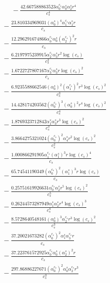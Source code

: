 \documentclass[10pt]{article}
\begin{document}
\begin{align*}
\phantom{R_{3,9}} &\phantom{={}}{}  - \frac{42.667588863523 \alpha_{0}^{c_s} \alpha_{0}^s \alpha_{2}^s r^{4}}{c_{s}^{4}} \\
&{}  - \frac{23.810334969031 \left(\alpha_{0}^s\right)^{4} \alpha_{1}^{c_s} \alpha_{1}^s r}{c_{s}} \\
&{}  - \frac{12.296291674866 \alpha_{0}^{c_s} \alpha_{0}^s \left(\alpha_{2}^{c_s}\right)^{2} r}{c_{s}} \\
&{}  - \frac{6.2197975239915 \alpha_{2}^{c_s} \alpha_{3}^s r^{2} \log{\left(c_{s} \right)}}{c_{s}^{2}} \\
&{}  - \frac{1.6722727807167 \alpha_{3}^{c_s} \alpha_{3}^s r \log{\left(c_{s} \right)}^{2}}{c_{s}} \\
&{}  - \frac{6.9235588662546 \left(\alpha_{0}^s\right)^{2} \left(\alpha_{1}^{c_s}\right)^{2} r^{3} \log{\left(c_{s} \right)}^{2}}{c_{s}^{3}} \\
&{}  - \frac{14.428174203562 \left(\alpha_{0}^{c_s}\right)^{3} \left(\alpha_{0}^s\right)^{2} r^{4} \log{\left(c_{s} \right)}^{2}}{c_{s}^{4}} \\
&{}  - \frac{1.8769323712842 \alpha_{1}^s \alpha_{3}^s r^{3} \log{\left(c_{s} \right)}^{2}}{c_{s}^{3}} \\
&{}  - \frac{3.8664275321024 \left(\alpha_{0}^{c_s}\right)^{2} \alpha_{4}^s r^{2} \log{\left(c_{s} \right)}^{2}}{c_{s}^{2}} \\
&{}  - \frac{1.000866291905 \alpha_{1}^{c_s} \left(\alpha_{1}^s\right)^{3} r \log{\left(c_{s} \right)}^{4}}{c_{s}} \\
&{}  - \frac{65.74541190349 \left(\alpha_{0}^{c_s}\right)^{2} \left(\alpha_{1}^s\right)^{3} r \log{\left(c_{s} \right)}}{c_{s}} \\
&{}  - \frac{0.25751619926631 \alpha_{0}^{c_s} \alpha_{2}^s r^{5} \log{\left(c_{s} \right)}^{2}}{c_{s}^{5}} \\
&{}  - \frac{0.26244573287949 \alpha_{1}^s \alpha_{2}^s r^{4} \log{\left(c_{s} \right)}^{3}}{c_{s}^{4}} \\
&{}  - \frac{8.5728640548161 \left(\alpha_{0}^s\right)^{3} \alpha_{2}^{c_s} r^{3} \log{\left(c_{s} \right)}^{2}}{c_{s}^{3}} \\
&{}  - \frac{37.20021673282 \left(\alpha_{0}^{c_s}\right)^{2} \alpha_{1}^s \alpha_{3}^{c_s} r}{c_{s}} \\
&{}  - \frac{37.223761572925 \alpha_{0}^{c_s} \alpha_{0}^s \left(\alpha_{2}^s\right)^{2} r}{c_{s}} \\
&{}  - \frac{297.86886227671 \left(\alpha_{0}^{c_s}\right)^{2} \alpha_{0}^s \alpha_{2}^{c_s} r^{3}}{c_{s}^{3}} \\

\end{align*}
\end{document}
